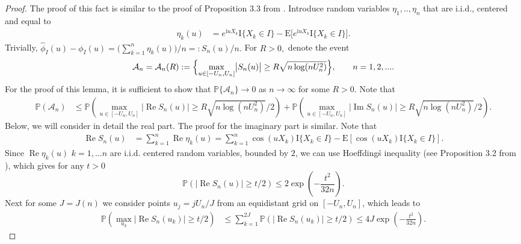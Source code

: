 \documentclass[numbers,webpdf,imaiai]{ima-authoring-template}%
\theoremstyle{thmstyletwo}%
\newcommand{\E}{\mathrm{E}}
\newcommand{\A}{\mathcal{A}}
\newcommand{\I}{{\mathrm{I}}}
\renewcommand{\i}{\mathrm{i}}
\renewcommand{\P}{\mathbb{P}}
\renewcommand{\Re}{\operatorname{Re}}
\renewcommand{\Im}{\operatorname{Im}}
\numberwithin{equation}{section}
\begin{document}
\begin{proof} 
The proof of this fact is similar to the proof of Proposition 3.3 from \cite{BR2015}. Introduce random variables \(\eta_1,..,\eta_n\) that are i.i.d., centered and equal to 
\begin{align*}
\eta_k(u) &= e^{\i u X_k} \I\{X_k \in I\}
-\E\bigl[
e^{\i u X_k} \I\{X_k \in I\}
\bigr].
\end{align*}
Trivially, \(\widehat\phi_I(u) - \phi_I(u) = \bigl( \sum_{k=1}^n \eta_k(u)\bigr)/n=: S_n(u)/n.\)
 For \(R>0,\) denote the event 
\begin{equation*}
    \mathcal{A}_n = \mathcal{A}_n (R) := \Bigl\{\max_{u \in [-U_n,U_n]} \bigl| S_n(u) \bigr| \geq  R\sqrt{n \log(nU_n^2)}
     \Bigr\}, \qquad n=1,2,....
\end{equation*}
For the proof of this lemma, it is sufficient to show that \( \P\{\A_n\} \to 0\) as \(n \to \infty\) for some \(R>0.\)
Note that
    \begin{align*}
        \P(\mathcal{A}_n) 
        &\leq   \P(\max_{u \in [-U_n, U_n]}  |\Re S_n(u)| \geq R\sqrt{n \log(nU_n^2)}/2)  + \P(\max_{u \in [-U_n, U_n]}|\Im S_n(u)| \geq R\sqrt{n \log(nU_n^2)}/2).
    \end{align*}
Below, we will consider in detail the real part. The proof for the imaginary part is similar.   Note that 
    \begin{align*}
        \Re S_n(u) &= \sum_{k=1}^n \Re \eta_k(u) = \sum_{k=1}^n \cos(uX_k)\I\{X_k \in I\} - \E [ \cos(uX_k)\I\{X_k \in I\}].
    \end{align*}
    Since $\Re \eta_k(u)$ $k = 1,\dots n$ are i.i.d. centered random variables, bounded by $2$, we can use Hoeffding\'s inequality (see Proposition 3.2 from \cite{BR2015}), which gives for any \(t>0\)
    \begin{equation*}
        \P(| \Re S_n(u)| \geq t/2) \leq 2\exp(-\frac{t^2}{32n}).
    \end{equation*}
    Next for some $J=J(n)$ we consider points $u_j = jU_n/J$ from an equidistant grid on $[-U_n, U_n]$, which leads to
    \begin{align*}
         \P(\max_{u_k}  |\Re S_n(u_k)| \geq t/2) &\leq \sum_{k = 1}^{2J}\P(| \Re S_n(u_k)| \geq t/2) \leq 4J \exp(-\frac{t^2}{32n}).

\end{align*}
\end{proof}
\end{document}
